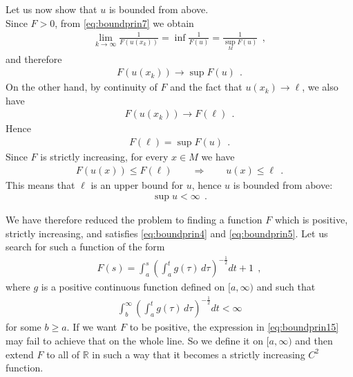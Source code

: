 \documentclass[a4paper,11pt,openright,twoside]{book}
\newcommand{\R}{\mathbb{R}}
\newcommand{\1}{\mathds{1}}
\theoremstyle{plain}
\theoremstyle{definition}
\theoremstyle{remark}
\begin{document}
Let us now show that $u$ is bounded from above.\\
Since $F>0$, from \eqref{eq:boundprin7} we obtain
\begin{align*}
	\lim_{k\to\infty}\frac{1}{F(u(x_k))}
	=
	\inf \frac{1}{F(u)}
	=
	\frac{1}{\sup_M F(u)}
	\ \ ,
\end{align*}
and therefore
\begin{align*}
	F(u(x_k))\to \sup F(u)
	\ \ .
\end{align*}
On the other hand, by continuity of $F$ and the fact that $u(x_k)\to \ell$, we also have
\begin{align*}
	F(u(x_k))\to F(\ell)
	\ \ .
\end{align*}
Hence
\begin{align*}
	F(\ell)=\sup F(u)
	\ \ .
\end{align*}
Since $F$ is strictly increasing, for every $x\in M$ we have
\begin{align*}
	F(u(x))\leq F(\ell)
	\qquad \Longrightarrow \qquad
	u(x)\leq \ell
	\ \ .
\end{align*}
This means that $\ell$ is an upper bound for $u$, hence $u$ is bounded from above:
\begin{align*}
	\sup u < \infty
	\ \ .
\end{align*}

We have therefore reduced the problem to finding a function $F$ which is positive, strictly increasing, and satisfies \eqref{eq:boundprin4} and \eqref{eq:boundprin5}. Let us search for such a function of the form
\begin{align}\label{eq:boundprin15}
	F(s) = \int_a^s \left( \int_a^t g(\tau)\,d\tau \right)^{-\frac{1}{2}} dt + 1
	\ \ ,
\end{align}
where $g$ is a positive continuous function defined on $[a,\infty)$ and such that
\begin{align*}
	\int_b^\infty \left( \int_a^t g(\tau)\,d\tau \right)^{-\frac{1}{2}} dt < \infty
\end{align*}
for some $b\geq a$. If we want $F$ to be positive, the expression in \eqref{eq:boundprin15} may fail to achieve that on the whole line. So we define it on $[a,\infty)$ and then extend $F$ to all of $\R$ in such a way that it becomes a strictly increasing $C^2$ function.\\
\end{document}
